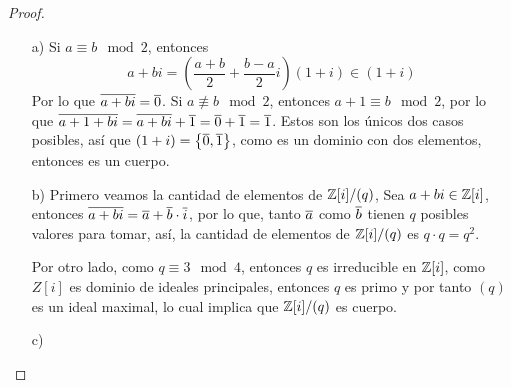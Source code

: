 \begin{problem}[6]
\end{problem}

\begin{proof} \,
    \begin{enumerate}
        \item[a)] Si $ a \equiv b \mod{2}$, entonces
        $$ a + bi = \left( \frac{a+b}{2} + \frac{b-a}{2}i \right)(1+i) \in (1+i) $$
        Por lo que $ \overline{a+bi} = \overline{0} $. Si $ a \not\equiv b \mod{2}$, entonces $a+1 \equiv b \mod{2}$, por lo que $ \overline{a+1 + bi} = \overline{a+bi} + \overline{1} = \overline{0} + \overline{1} = \overline{1}  $. Estos son los únicos dos casos posibles, así que $(1+i) = \left\{\overline{0}, \overline{1} \right\}$, como es un dominio con dos elementos, entonces es un cuerpo.

        \item[b)] Primero veamos la cantidad de elementos de $ \mathbb{Z}[i]/(q) $, Sea $a + bi \in \mathbb{Z}[i]$, entonces $\overline{a+bi} = \overline{a} + \overline{b} \cdot \overline{i}$, por lo que, tanto $\overline{a}$ como $\overline{b}$ tienen $q$ posibles valores para tomar, así, la cantidad de elementos de $ \mathbb{Z}[i]/(q) $ es $q\cdot q = q^2$.
        
        Por otro lado, como $q \equiv 3 \mod{4}$, entonces $q$ es irreducible en $\mathbb{Z}[i]$, como $Z[i]$ es dominio de ideales principales, entonces $q$ es primo y por tanto $(q)$ es un ideal maximal, lo cual implica que $\mathbb{Z}[i]/(q)$ es cuerpo.

        \item[c)]
    \end{enumerate}

\end{proof}